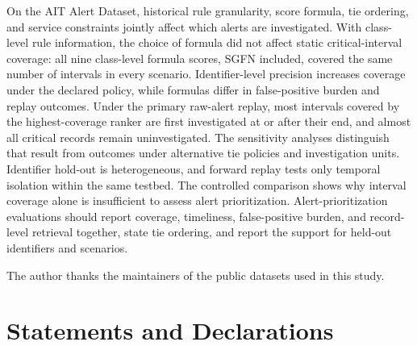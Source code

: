 \documentclass[pdflatex,sn-basic,Numbered]{sn-jnl}
\begin{document}
On the AIT Alert Dataset, historical rule granularity, score formula, tie ordering, and service constraints jointly affect which alerts are investigated. With class-level rule information, the choice of formula did not affect static critical-interval coverage: all nine class-level formula scores, SGFN included, covered the same number of intervals in every scenario. Identifier-level precision increases coverage under the declared policy, while formulas differ in false-positive burden and replay outcomes. Under the primary raw-alert replay, most intervals covered by the highest-coverage ranker are first investigated at or after their end, and almost all critical records remain uninvestigated. The sensitivity analyses distinguish that result from outcomes under alternative tie policies and investigation units. Identifier hold-out is heterogeneous, and forward replay tests only temporal isolation within the same testbed. The controlled comparison shows why interval coverage alone is insufficient to assess alert prioritization. Alert-prioritization evaluations should report coverage, timeliness, false-positive burden, and record-level retrieval together, state tie ordering, and report the support for held-out identifiers and scenarios.

\backmatter


The author thanks the maintainers of the public datasets used in this study.

\section*{Statements and Declarations}
\end{document}
